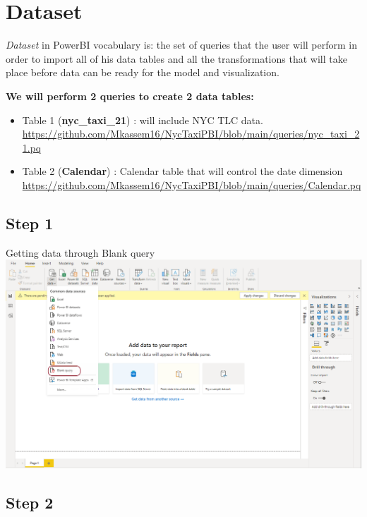 \documentclass[
]{book}
\providecommand{\tightlist}{%
  \setlength{\itemsep}{0pt}\setlength{\parskip}{0pt}}
\begin{document}
\hypertarget{dataset}{%
\chapter{Dataset}\label{dataset}}

\emph{Dataset} in PowerBI vocabulary is: the set of queries that the user will perform in order to import all of his data tables and all the transformations that will take place before data can be ready for the model and visualization.

\textbf{We will perform 2 queries to create 2 data tables:}

\begin{itemize}
\tightlist
\item
  Table 1 (\textbf{nyc\_taxi\_21}) : will include NYC TLC data. \url{https://github.com/Mkassem16/NycTaxiPBI/blob/main/queries/nyc_taxi_21.pq}
\item
  Table 2 (\textbf{Calendar}) : Calendar table that will control the date dimension
  \url{https://github.com/Mkassem16/NycTaxiPBI/blob/main/queries/Calendar.pq}
\end{itemize}

\hypertarget{step-1}{%
\section{Step 1}\label{step-1}}

Getting data through Blank query
\includegraphics{assets/get_data.png}

\hypertarget{step-2}{%
\section{Step 2}\label{step-2}}
\end{document}
